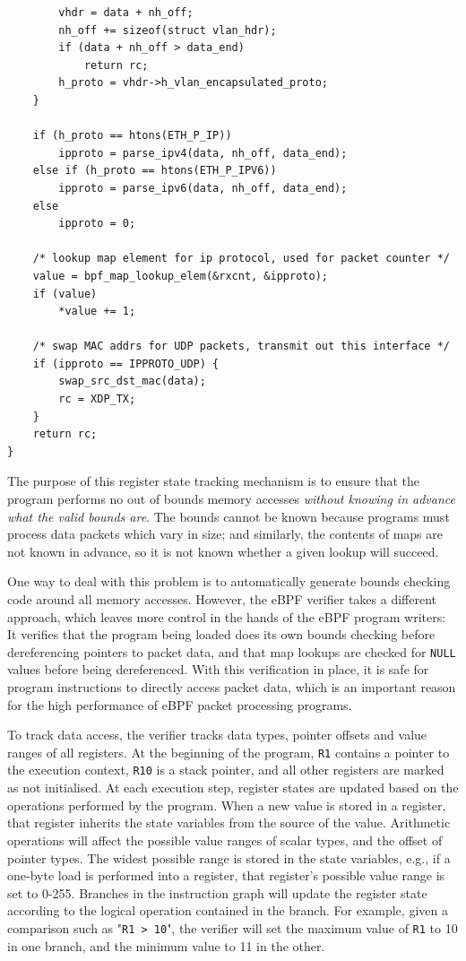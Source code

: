 \documentclass[sigconf]{acmart}
\begin{document}
\begin{listing}[p]
\begin{verbatim}
		vhdr = data + nh_off;
		nh_off += sizeof(struct vlan_hdr);
		if (data + nh_off > data_end)
			return rc;
		h_proto = vhdr->h_vlan_encapsulated_proto;
	}

	if (h_proto == htons(ETH_P_IP))
		ipproto = parse_ipv4(data, nh_off, data_end);
	else if (h_proto == htons(ETH_P_IPV6))
		ipproto = parse_ipv6(data, nh_off, data_end);
	else
		ipproto = 0;

	/* lookup map element for ip protocol, used for packet counter */
	value = bpf_map_lookup_elem(&rxcnt, &ipproto);
	if (value)
		*value += 1;

	/* swap MAC addrs for UDP packets, transmit out this interface */
	if (ipproto == IPPROTO_UDP) {
		swap_src_dst_mac(data);
		rc = XDP_TX;
	}
	return rc;
}

\end{verbatim}
\end{listing}

The purpose of this register state tracking mechanism is to ensure that the
program performs no out of bounds memory accesses \emph{without knowing in
  advance what the valid bounds are}. The bounds cannot be known because
programs must process data packets which vary in size; and similarly, the
contents of maps are not known in advance, so it is not known whether a given
lookup will succeed.

One way to deal with this problem is to automatically generate bounds checking
code around all memory accesses. However, the eBPF verifier takes a different
approach, which leaves more control in the hands of the eBPF program writers: It
verifies that the program being loaded does its own bounds checking before
dereferencing pointers to packet data, and that map lookups are checked for
\texttt{NULL} values before being dereferenced. With this verification in place,
it is safe for program instructions to directly access packet data, which is an
important reason for the high performance of eBPF packet processing programs.

To track data access, the verifier tracks data types, pointer offsets and value
ranges of all registers. At the beginning of the program, \texttt{R1} contains a
pointer to the execution context, \texttt{R10} is a stack pointer, and all other
registers are marked as not initialised. At each execution step, register states
are updated based on the operations performed by the program. When a new value
is stored in a register, that register inherits the state variables from the
source of the value. Arithmetic operations will affect the possible value ranges
of scalar types, and the offset of pointer types. The widest possible range is
stored in the state variables, e.g., if a one-byte load is performed into a
register, that register's possible value range is set to 0-255. Branches in the
instruction graph will update the register state according to the logical
operation contained in the branch. For example, given a comparison such as
"\texttt{R1 > 10}", the verifier will set the maximum value of \texttt{R1} to 10
in one branch, and the minimum value to 11 in the other.
\end{document}
